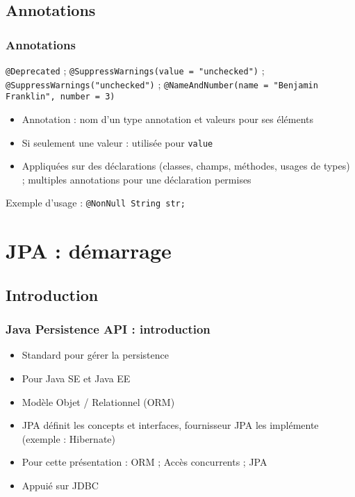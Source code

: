 \documentclass[english, french]{beamer}
\begin{document}
\subsection{Annotations}
\begin{frame}
	\frametitle{Annotations}
	\texttt{@Deprecated} ; \texttt{@SuppressWarnings(value = "unchecked")} ; \texttt{@SuppressWarnings("unchecked")} ; \texttt{@NameAndNumber(name = "Benjamin Franklin", number = 3)}
	\begin{itemize}
		\item Annotation : nom d’un type annotation et valeurs pour ses éléments
		\item Si seulement une valeur : utilisée pour \texttt{value}
		\item Appliquées sur des déclarations (classes, champs, méthodes, usages de types) ; multiples annotations pour une déclaration permises
	\end{itemize}
	Exemple d’usage : \texttt{@NonNull String str;}
\end{frame}

\section{JPA : démarrage}
\subsection{Introduction}
\begin{frame}
	\frametitle{Java Persistence API : introduction}
	\begin{itemize}
		\item Standard pour gérer la persistence
		\item Pour Java SE et Java EE
		\item Modèle Objet / Relationnel (ORM)
		\item JPA définit les concepts et interfaces, fournisseur JPA les implémente (exemple : Hibernate)
		\item Pour cette présentation : ORM ; Accès concurrents ; JPA
		\item Appuié sur JDBC
	\end{itemize}
\end{frame}
\end{document}
